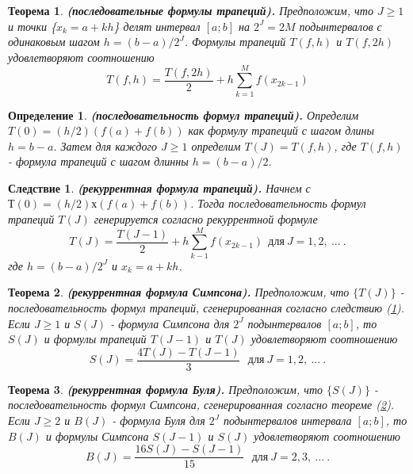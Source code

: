 \documentclass[14pt, titlepage, a4paper]{extarticle} %
\newtheorem{theorem}{Теорема}
\newtheorem{definition}{Определение}
\newtheorem{corollary}{Следствие}
\begin{document}
	\begin{theorem}\label{th:7.4}
		\textbf{(последовательные формулы трапеций).} Предположим, что $J \geqslant 1$ и точки \{$x_k = a + kh$\} делят интервал $\left[a; b\right]$ на $2^J = 2M$ подынтервалов с одинаковым шагом $h = (b-a)/2^J$. Формулы трапеций $T(f,h)$ и $T(f,2h)$ удовлетворяют соотношению
		\begin{equation}\label{eq:1}
			T(f,h)=\frac{T(f,2h)}{2} + h\sum_{k=1}^{M}f(x_{2k-1})
		\end{equation}
	\end{theorem}
	
	\begin{definition}\label{df:7.3}
		\textbf{(последовательность формул трапеций).} Определим $T(0) = (h/2)(f(a)+f(b))$ как формулу трапеций с шагом длины $h = b - a$. Затем для каждого $J\ge1$ определим $T(J)=T(f,h)$, где $T(f,h)$ - формула трапеций с шагом длинны $h = (b-a)/2$.
	\end{definition}
	
	\begin{corollary}\label{cr:7.4}
	\textbf{(рекуррентная формула трапеций).} Начнем с $Т(0) = (h/2) х (f(a) + f(b))$. Тогда последовательность формул трапеций ${T(J)}$ генерируется согласно рекуррентной формуле
		\begin{equation}\label{eq:2}
			T(J) = \frac{T(J-1)}{2}+ h\sum_{k-1}^{M}f(x_{2k-1})~~\text{для}~J = 1, 2,~...~.
		\end{equation}
	где $h=(b-a)/2^J$ и ${x_k = a + kh}$.
	\end{corollary}
	
	
	\begin{theorem}\label{th:7.5}
		\textbf{(рекуррентная формула Симпсона).} Предположим, что $\{T(J)\}$ - последовательность формул трапеций, сгенерированная согласно следствию (\ref{cr:7.4}). Если $J\ge1$ и $S(J)$ - формула Симпсона для $2^J$ подынтервалов $[a;b]$, то $S(J)$ и формулы трапеций $T(J-1)$ и $T(J)$ удовлетворяют соотношению
		\begin{equation}\label{eq:7}
			S(J) = \frac{4T(J)-T(J-1)}{3}~~~\text{для}~J = 1,2,~...~.
		\end{equation}
	\end{theorem}
	
	
	\begin{theorem}\label{th:7.6}
		\textbf{(рекуррентная формула Буля).} Предположим, что $\{S(J)\}$ - последовательность формул Симпсона, сгенерированная согласно теореме (\ref{th:7.5}). Если $J\ge2$ и $B(J)$ - формула Буля для $2^J$ подынтервалов интервала $[a;b]$, то $B(J)$ и формулы Симпсона $S(J-1)$ и $S(J)$ удовлетворяют соотношению
		\begin{equation}\label{eq:14}
			B(J) = \frac{16S(J)-S(J-1)}{15}~~~\text{для}~J=2,3,~...~.
		\end{equation}
	\end{theorem}
	~\\
\end{document}
